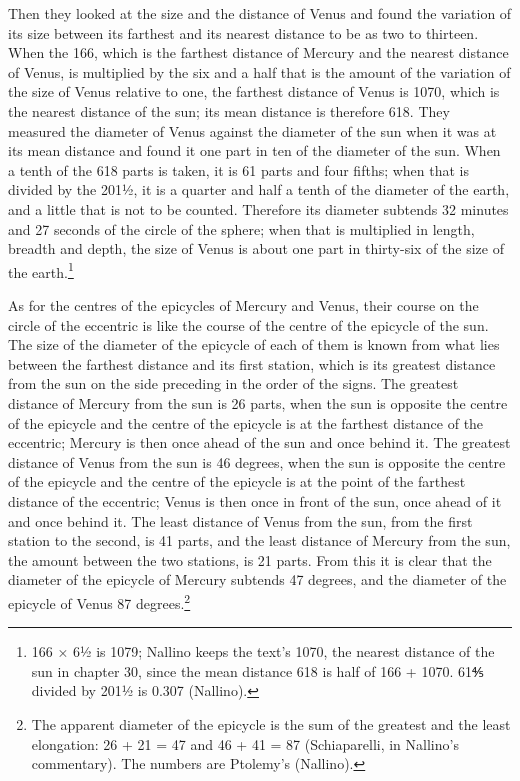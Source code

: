 \documentclass[11pt]{article}
\newcommand{\ArPage}[1]{\marginpar{\footnotesize\color{gray}Ar.\,p.\,#1}}
\begin{document}
\par \ArPage{183}Then they looked at the size and the distance of Venus and found the variation of its size between its farthest and its nearest distance to be as two to thirteen. When the 166, which is the farthest distance of Mercury and the nearest distance of Venus, is multiplied by the six and a half that is the amount of the variation of the size of Venus relative to one, the farthest distance of Venus is 1070, which is the nearest distance of the sun; its mean distance is therefore 618. They measured the diameter of Venus against the diameter of the sun when it was at its mean distance and found it one part in ten of the diameter of the sun. When a tenth of the 618 parts is taken, it is 61 parts and four fifths; when that is divided by the 201½, it is a quarter and half a tenth of the diameter of the earth, and a little that is not to be counted. Therefore its diameter subtends 32 minutes and 27 seconds of the circle of the sphere; when that is multiplied in length, breadth and depth, the size of Venus is about one part in thirty-six of the size of the earth.\footnote{166 × 6½ is 1079; Nallino keeps the text's 1070, the nearest distance of the sun in chapter 30, since the mean distance 618 is half of 166 + 1070. 61⅘ divided by 201½ is 0.307 (Nallino).}\par
\par As for the centres of the epicycles of Mercury and Venus, their course on the circle of the eccentric is like the course of the centre of the epicycle of the sun. The size of the diameter of the epicycle of each of them is known from what lies between the farthest distance and its first station, which is its greatest distance from the sun on the side preceding in the order of the signs. The greatest distance of Mercury from the sun is 26 parts, when the sun is opposite the centre of the epicycle and the centre of the epicycle is at the farthest distance of the eccentric; Mercury is then once ahead of the sun and once behind it. The greatest distance of Venus from the sun is 46 degrees, when the sun is opposite the centre of the epicycle and the centre of the epicycle is at the point of the farthest distance of the eccentric; Venus is then once in front of the sun, once ahead of it and once behind it. The least distance of Venus from the sun, from the first station to the second, is 41 parts, and the least distance of Mercury from the sun, the amount between the two stations, is 21 parts. From this it is clear that the diameter of the epicycle of Mercury subtends 47 degrees, and the diameter of the epicycle of Venus 87 degrees.\footnote{The apparent diameter of the epicycle is the sum of the greatest and the least elongation: 26 + 21 = 47 and 46 + 41 = 87 (Schiaparelli, in Nallino's commentary). The numbers are Ptolemy's (Nallino).}\par
\end{document}
